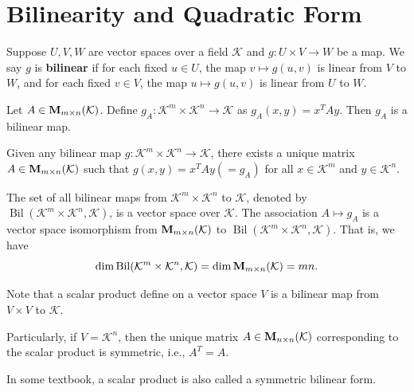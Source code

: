     \section{Bilinearity and Quadratic Form}
    \begin{definitionenv}
        Suppose $U,V,W$ are vector spaces over a field $\mathcal{K}$ and $g: U \times V \to W$ be a map. We say $g$ is \textbf{bilinear} if for each fixed $u \in U$, the map $v \mapsto g(u,v)$ is linear from $V$ to $W$, and for each fixed $v \in V$, the map $u \mapsto g(u,v)$ is linear from $U$ to $W$.
    \end{definitionenv}
    \begin{exampleenv}
        Let $A \in \mathbf{M}_{m \times n}(\mathcal{K})$. Define $g_A: \mathcal{K}^m \times \mathcal{K}^n \to \mathcal{K}$ as $g_A(x,y) = x^T A y$. Then $g_A$ is a bilinear map.
    \end{exampleenv}
    \begin{theoremenv}
        Given any bilinear map $g: \mathcal{K}^m \times \mathcal{K}^n \to \mathcal{K}$, there exists a unique matrix $A \in \mathbf{M}_{m \times n}(\mathcal{K})$ such that $g(x,y) = x^T A y \left(=g_A\right)$ for all $x\in \mathcal{K}^m$ and $y\in \mathcal{K}^n$.
    \end{theoremenv}
    \begin{theoremenv}
        The set of all bilinear maps from $\mathcal{K}^m \times \mathcal{K}^n$ to $\mathcal{K}$, denoted by $\operatorname{Bil}(\mathcal{K}^m \times \mathcal{K}^n, \mathcal{K})$, is a vector space over $\mathcal{K}$. The association $A \mapsto g_A$ is a vector space isomorphism from $\mathbf{M}_{m \times n}(\mathcal{K})$ to $\operatorname{Bil}(\mathcal{K}^m \times \mathcal{K}^n, \mathcal{K})$. That is, we have
        \[
        \dim \operatorname{Bil}(\mathcal{K}^m \times \mathcal{K}^n, \mathcal{K}) = \dim \mathbf{M}_{m \times n}(\mathcal{K}) = mn.
        \]
    \end{theoremenv}
    \begin{remarkenv}
        Note that a scalar product define on a vector space $V$ is a bilinear map from $V \times V$ to $\mathcal{K}$. 
        
        Particularly, if $V = \mathcal{K}^n$, then the unique matrix $A\in \mathbf{M}_{n \times n}(\mathcal{K})$ corresponding to the scalar product is symmetric, i.e., $A^T = A$.
    \end{remarkenv}
    \begin{remarkenv}
        In some textbook, a scalar product is also called a symmetric bilinear form.
    \end{remarkenv}
